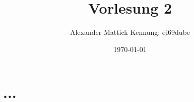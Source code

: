 \documentclass{article}
\title{Vorlesung 2}
\date{\today}
\author{
Alexander Mattick Kennung: qi69dube
}
\begin{document}
	\maketitle
	\section{...}
\end{document}
